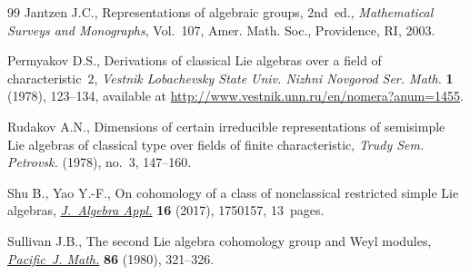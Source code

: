 \documentclass[pdftex]{sigma}%
\numberwithin{equation}{section}
\begin{document}
\begin{thebibliography}{99}
Jantzen J.C., Representations of algebraic groups, 2nd~ed., \textit{Mathematical Surveys
 and Monographs}, Vol.~107, Amer. Math. Soc., Providence, RI, 2003.

Permyakov D.S., Derivations of classical {L}ie algebras over a field of
 characteristic~$2$, \textit{Vestnik Lobachevsky State Univ. Nizhni Novgorod
 Ser. Math.} \textbf{1} (1978), 123--134, available at
 \url{http://www.vestnik.unn.ru/en/nomera?anum=1455}.

Rudakov A.N., Dimensions of certain irreducible representations of semisimple
 {L}ie algebras of classical type over fields of finite characteristic,
 \textit{Trudy Sem. Petrovsk.} (1978), no.~3, 147--160.

Shu B., Yao Y.-F., On cohomology of a class of nonclassical restricted simple
 {L}ie algebras, \href{https://doi.org/10.1142/S0219498817501572}{\textit{J.~Algebra Appl.}} \textbf{16} (2017), 1750157,
 13~pages.

Sullivan J.B., The second {L}ie algebra cohomology group and {W}eyl modules,
 \href{https://doi.org/10.2140/pjm.1980.86.321}{\textit{Pacific~J. Math.}} \textbf{86} (1980), 321--326.

\end{thebibliography}\LastPageEnding
\end{document}
